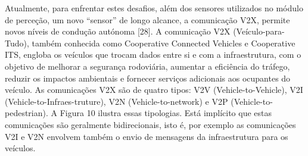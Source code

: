 \documentclass[a4paper,10pt]{texRel}
\begin{document}
Atualmente, para enfrentar estes desafios, além dos sensores utilizados no módulo de perceção, um novo “sensor” de longo alcance, a comunicação V2X, permite novos níveis de condução autónoma [28].
A comunicação V2X (Veículo-para-Tudo), também conhecida como Cooperative Connected Vehicles e Cooperative ITS, engloba os veículos que trocam dados entre si e com a infraestrutura, com o objetivo de melhorar a segurança rodoviária, aumentar a eficiência do tráfego, reduzir os impactos ambientais e fornecer serviços adicionais aos ocupantes do veículo.
As comunicações V2X são de quatro tipos: V2V (Vehicle-to-Vehicle), V2I (Vehicle-to-Infraes-truture), V2N (Vehicle-to-network) e V2P (Vehicle-to-pedestrian). A Figura 10 ilustra essas tipologias. Está implícito que estas comunicações são geralmente bidirecionais, isto é, por exemplo as comunicações V2I e V2N envolvem também o envio de mensagens da infraestrutura para os veículos.
\end{document}

